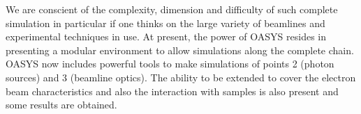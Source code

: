 \documentclass{aip-cp}
\begin{document}
We are conscient of the complexity, dimension and difficulty of such complete simulation in particular if one thinks on the large variety of beamlines and experimental techniques in use. At present, the power of OASYS resides in presenting a modular environment to allow simulations along the complete chain. OASYS now includes powerful tools to make simulations of points 2 (photon sources) and 3 (beamline optics). The ability to be extended to cover the electron beam characteristics and also the interaction with samples is also present and some results are obtained. 



% 
% 
% 
% 
\end{document}
